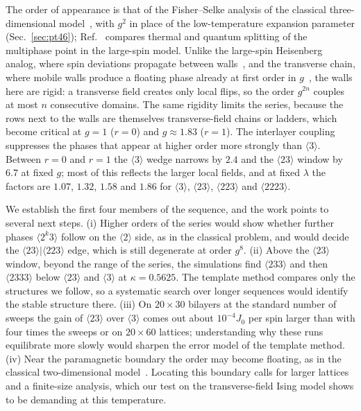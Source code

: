 \documentclass[
 aps,prb,
 twocolumn,
 superscriptaddress,
 longbibliography,
 nofootinbib,
 floatfix
]{revtex4-2}
\begin{document}
The order of appearance is that of the Fisher--Selke analysis of the classical three-dimensional
model~\cite{fisher1980infinitely,fisher1981low,selke1988annni}, with $g^2$ in place of the low-temperature expansion
parameter (Sec.~\ref{sec:pt46}); Ref.~\cite{yeomans1995splitting} compares thermal and quantum splitting of the
multiphase point in the large-spin model. Unlike the large-spin Heisenberg analog, where spin deviations propagate
between walls~\cite{harris1995quantum,harris1995quantumb}, and the transverse chain, where mobile walls produce a floating
phase already at first order in $g$~\cite{chandra2007floating}, the walls here are rigid: a transverse field creates
only local flips, so the order $g^{2n}$ couples at most $n$ consecutive domains. The same rigidity limits the series,
because the rows next to the walls are themselves transverse-field chains or ladders, which become critical at $g=1$
($r=0$) and $g\approx1.83$ ($r=1$). The interlayer coupling suppresses the phases that appear at higher order more
strongly than $\langle3\rangle$. Between $r=0$ and $r=1$ the $\langle3\rangle$ wedge narrows by $2.4$ and the
$\langle23\rangle$ window by $6.7$ at fixed $g$; most of this reflects the larger local fields, and at fixed $\lambda$ the
factors are $1.07$, $1.32$, $1.58$ and $1.86$ for $\langle3\rangle$, $\langle23\rangle$, $\langle223\rangle$ and
$\langle2223\rangle$.

We establish the first four members of the sequence, and the work points to several next steps.
(i) Higher orders of the series would show whether further phases $\langle2^k3\rangle$ follow on the $\langle2\rangle$
side, as in the classical problem, and would decide the $\langle23\rangle|\langle223\rangle$ edge, which is still degenerate
at order $g^8$. (ii) Above the $\langle23\rangle$ window, beyond the range of the series, the simulations find
$\langle233\rangle$ and then $\langle2333\rangle$ below $\langle23\rangle$ and $\langle3\rangle$ at $\kappa=0.5625$. The
template method compares only the structures we follow, so a systematic search over longer sequences would identify the
stable structure there. (iii) On $20\times30$ bilayers at the standard number of sweeps the gain of $\langle23\rangle$ over
$\langle3\rangle$ comes out about $10^{-4}J_0$ per spin larger than with four times the sweeps or on $20\times60$
lattices; understanding why these runs equilibrate more slowly would sharpen the error model of the template method. (iv) Near the paramagnetic boundary the order may become floating, as in the
classical two-dimensional model~\cite{villain1981two,hu2021resolving}. Locating this boundary calls for larger lattices
and a finite-size analysis, which our test on the transverse-field Ising model shows to be demanding at this
temperature.
\end{document}
